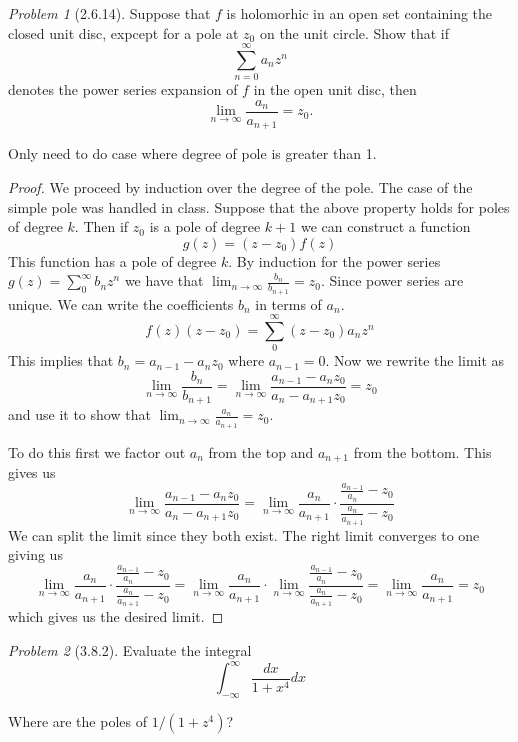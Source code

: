 \documentclass[10pt]{article}
\newcommand{\sk}{\vskip 10mm}
\theoremstyle{remark}
\newtheorem{problem}{Problem}
\theoremstyle{remark}
\begin{document}
\begin{problem}[2.6.14]
  Suppose that $f$ is holomorhic in an open set containing the closed unit disc,
  expcept for a pole at $z_0$ on the unit circle. Show that if
  \[
    \sum_{n=0}^\infty a_n z^n
  \]
  denotes the power series expansion of $f$ in the open unit disc, then
  \[
    \lim_{n\rightarrow\infty}\frac{a_n}{a_{n+1}}=z_0.
  \]
  
  Only need to do case where degree of pole is greater than 1.
\end{problem}

\begin{proof}
  We proceed by induction over the degree of the pole. The case of the simple
  pole was handled in class. Suppose that the above property holds for poles of
  degree $k$. Then if $z_0$ is a pole of degree $k+1$ we can construct a function
  \[
    g(z)=(z-z_0)f(z)
  \]
  This function has a pole of degree $k$. By induction for the power series
  $g(z)=\sum_0^\infty b_nz^n$ we have that $\lim_{n\rightarrow\infty}\frac{b_n}{b_{n+1}}=z_0$. Since
  power series are unique. We can write the coefficients $b_n$ in terms of $a_n$.
  \[
    f(z)(z-z_0)=\sum_0^\infty(z-z_0)a_nz^n
  \]
  This implies that $b_n=a_{n-1}-a_nz_0$ where $a_{n-1}=0$. Now we rewrite the limit
  as
  \[
    \lim_{n\rightarrow\infty}\frac{b_n}{b_{n+1}}=\lim_{n\rightarrow\infty}\frac{a_{n-1}-a_nz_0}{a_n-a_{n+1}z_0}=z_0
  \]
  and use it to show that $\lim_{n\rightarrow\infty}\frac{a_n}{a_{n+1}}=z_0$.

  To do this first we factor out $a_n$ from the top and $a_{n+1}$ from the bottom. This
  gives us
  \[
    \lim_{n\rightarrow\infty}\frac{a_{n-1}-a_nz_0}{a_n-a_{n+1}z_0}=\lim_{n\rightarrow\infty}\frac{a_n}{a_{n+1}}\cdot\frac{\frac{a_{n-1}}{a_n}-z_0}{\frac{a_n}{a_{n+1}}-z_0}
  \]
  We can split the limit since they both exist. The right limit converges to one giving us
  \[
    \lim_{n\rightarrow\infty}\frac{a_n}{a_{n+1}}\cdot\frac{\frac{a_{n-1}}{a_n}-z_0}{\frac{a_n}{a_{n+1}}-z_0}=\lim_{n\rightarrow\infty} \frac{a_n}{a_{n+1}}\cdot\lim_{n\rightarrow\infty}\frac{\frac{a_{n-1}}{a_n}-z_0}{\frac{a_n}{a_{n+1}}-z_0} = \lim_{n\rightarrow\infty}\frac{a_n}{a_{n+1}}=z_0
  \]
  which gives us the desired limit.
\end{proof}

\sk

\begin{problem}[3.8.2]
  Evaluate the integral
  \[
    \int_{-\infty}^\infty \frac{dx}{1+x^4}dx
  \]

  Where are the poles of $1/(1+z^4)$?
\end{problem}
\end{document}
